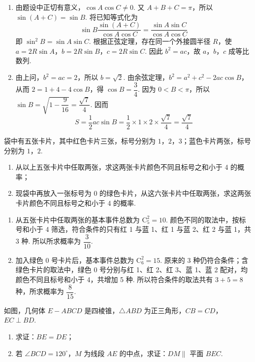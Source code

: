 \begin{solution}
\begin{enumerate}
\item 由题设中正切有意义，\(\cos A\cos C\neq0\). 又 \(A+B+C=\pi\)，所以 \(\sin(A+C)=\sin B\). 将已知等式化为
\[
\sin B\frac{\sin(A+C)}{\cos A\cos C}=\frac{\sin A\sin C}{\cos A\cos C}
\]
即 \(\sin^2B=\sin A\sin C\). 根据正弦定理，存在同一个外接圆半径 \(R\)，使 \(a=2R\sin A\)，\(b=2R\sin B\)，\(c=2R\sin C\). 因此 \(b^2=ac\)，故 \(a\)，\(b\)，\(c\) 成等比数列.
\item 由上问，\(b^2=ac=2\)，所以 \(b=\sqrt2\). 由余弦定理，\(b^2=a^2+c^2-2ac\cos B\)，从而 \(2=1+4-4\cos B\)，得 \(\cos B=\dfrac34\). 因为 \(0<B<\pi\)，所以 \(\sin B=\sqrt{1-\dfrac9{16}}=\dfrac{\sqrt7}{4}\). 因而
\[
S=\frac12ac\sin B=\frac12\times1\times2\times\frac{\sqrt7}{4}=\frac{\sqrt7}{4}
\]
\end{enumerate}
\end{solution}

\begin{problem}
袋中有五张卡片，其中红色卡片三张，标号分别为 \(1\)，\(2\)，\(3\)；蓝色卡片两张，标号分别为 \(1\)，\(2\).
\begin{enumerate}
\item 从以上五张卡片中任取两张，求这两张卡片颜色不同且标号之和小于 4 的概率；
\item 现袋中再放入一张标号为 0 的绿色卡片，从这六张卡片中任取两张，求这两张卡片颜色不同且标号之和小于 4 的概率.
\end{enumerate}
\end{problem}

\begin{solution}
\begin{enumerate}
\item 从五张卡片中任取两张的基本事件总数为 \(\mathrm C_5^2=10\). 颜色不同的取法中，按标号和小于 4 筛选，符合条件的只有红 1 与蓝 1、红 1 与蓝 2、红 2 与蓝 1，共 3 种. 所以所求概率为 \(\dfrac3{10}\).
\item 加入绿色 0 号卡片后，基本事件总数为 \(\mathrm C_6^2=15\). 原来的 3 种仍符合条件；含绿色卡片的取法中，绿色 0 号分别与红 1、红 2、红 3、蓝 1、蓝 2 配对，均颜色不同且标号和小于 4，共增加 5 种. 所以符合条件的取法共有 \(3+5=8\) 种，所求概率为 \(\dfrac8{15}\).
\end{enumerate}
\end{solution}

\begin{problem}
如图，几何体 \(E-ABCD\) 是四棱锥，\(\triangle ABD\) 为正三角形，\(CB=CD\)，\(EC\perp BD\).
\begin{enumerate}
\item 求证：\(BE=DE\)；
\item 若 \(\angle BCD=120^{\circ}\)，\(M\) 为线段 \(AE\) 的中点，求证：\(DM\parallel\) 平面 \(BEC\).
\end{enumerate}
\end{problem}

